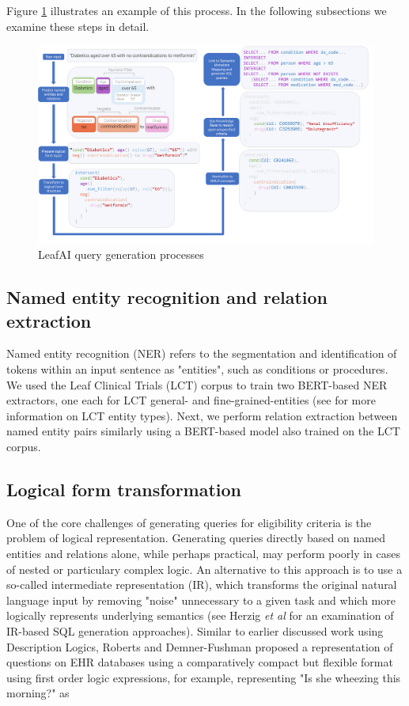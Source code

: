 \documentclass[../main.tex]{subfiles}
\begin{document}
\noindent Figure \ref{fig_leafai_querygen} illustrates an example of this process. In the following subsections we examine these steps in detail.

\begin{figure}[h]
  \includegraphics[scale=0.44]{figures/leafai_flow.pdf}  
\caption{LeafAI query generation processes}
\label{fig_leafai_querygen}
\end{figure}

\subsection*{Named entity recognition and relation extraction}

\noindent Named entity recognition (NER) refers to the segmentation and identification of tokens within an input sentence as "entities", such as conditions or procedures. We used the Leaf Clinical Trials (LCT) corpus \cite{dobbins2022leaf} to train two BERT-based \cite{devlin2018bert} NER extractors, one each for LCT general- and fine-grained-entities (see \cite{dobbins2022leaf} for more information on LCT entity types). Next, we perform relation extraction between named entity pairs similarly using a BERT-based model also trained on the LCT corpus.

\subsection*{Logical form transformation}

\noindent One of the core challenges of generating queries for eligibility criteria is the problem of logical representation. Generating queries directly based on named entities and relations alone, while perhaps practical, may perform poorly in cases of nested or particulary complex logic. An alternative to this approach is to use a so-called intermediate representation (IR), which transforms the original natural language input by removing "noise" unnecessary to a given task and which more logically represents underlying semantics (see Herzig \textit{et al} \cite{herzig2021unlocking} for an examination of IR-based SQL generation approaches). Similar to earlier discussed work using Description Logics, Roberts and Demner-Fushman \cite{roberts2016annotating} proposed a representation of questions on EHR databases using a comparatively compact but flexible format using first order logic expressions, for example, representing "Is she wheezing this morning?" as
\end{document}
